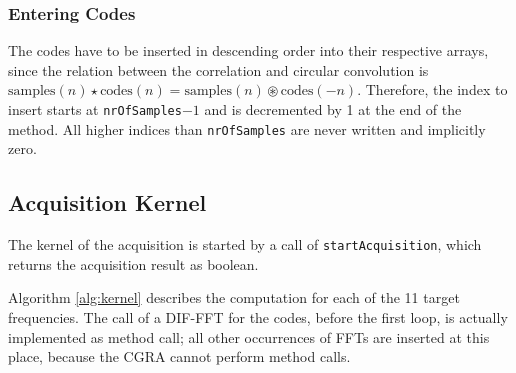 \subsubsection{Entering Codes}
\label{subsubsec:enterCodes}
The codes have to be inserted in descending order into their respective arrays, since the relation between the correlation and circular convolution is $\text{samples}(n) \star \text{codes}(n) = \text{samples}(n) \circledast \text{codes}(-n)$. Therefore, the index to insert starts at \texttt{nrOfSamples}$-1$ and is decremented by 1 at the end of the method. 
All higher indices than \texttt{nrOfSamples} are never written and implicitly zero.

\subsection{Acquisition Kernel}
\label{subsec:startAcquisition}
The kernel of the acquisition is started by a call of \texttt{startAcquisition}, which returns the acquisition result as boolean.

Algorithm \ref{alg:kernel} describes the computation for each of the 11 target frequencies. The call of a DIF-FFT for the codes, before the first loop, is actually implemented as method call; all other occurrences of FFTs are inserted at this place, because the CGRA cannot perform method calls.

